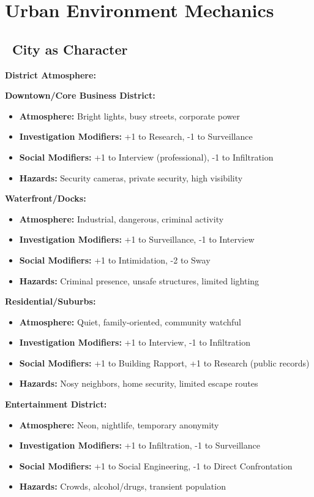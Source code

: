 \documentclass[11pt]{article}
\begin{document}
\newpage

\section{Urban Environment Mechanics}

\subsection*{\faCity\ City as Character}

\textbf{District Atmosphere:}

\textbf{Downtown/Core Business District:}
\begin{itemize}
    \item \textbf{Atmosphere:} Bright lights, busy streets, corporate power
    \item \textbf{Investigation Modifiers:} +1 to Research, -1 to Surveillance
    \item \textbf{Social Modifiers:} +1 to Interview (professional), -1 to Infiltration
    \item \textbf{Hazards:} Security cameras, private security, high visibility
\end{itemize}

\textbf{Waterfront/Docks:}
\begin{itemize}
    \item \textbf{Atmosphere:} Industrial, dangerous, criminal activity
    \item \textbf{Investigation Modifiers:} +1 to Surveillance, -1 to Interview
    \item \textbf{Social Modifiers:} +1 to Intimidation, -2 to Sway
    \item \textbf{Hazards:} Criminal presence, unsafe structures, limited lighting
\end{itemize}

\textbf{Residential/Suburbs:}
\begin{itemize}
    \item \textbf{Atmosphere:} Quiet, family-oriented, community watchful
    \item \textbf{Investigation Modifiers:} +1 to Interview, -1 to Infiltration
    \item \textbf{Social Modifiers:} +1 to Building Rapport, +1 to Research (public records)
    \item \textbf{Hazards:} Nosy neighbors, home security, limited escape routes
\end{itemize}

\textbf{Entertainment District:}
\begin{itemize}
    \item \textbf{Atmosphere:} Neon, nightlife, temporary anonymity
    \item \textbf{Investigation Modifiers:} +1 to Infiltration, -1 to Surveillance
    \item \textbf{Social Modifiers:} +1 to Social Engineering, -1 to Direct Confrontation
    \item \textbf{Hazards:} Crowds, alcohol/drugs, transient population
\end{itemize}
\end{document}
